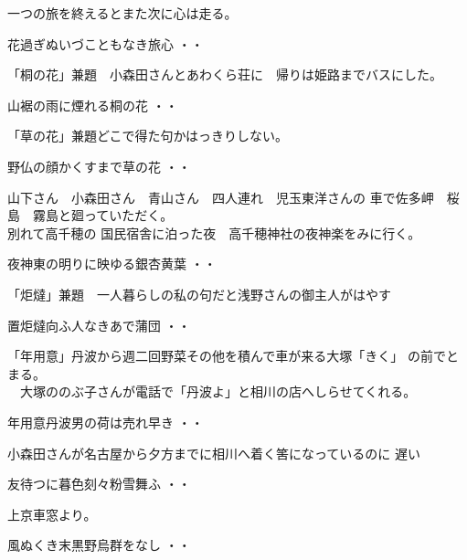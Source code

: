 \vspace{0.6cm}
一つの旅を終えるとまた次に心は走る。
\begin{shiika}花過ぎぬいづこともなき旅心
\hfill{・・}\end{shiika}
\vspace{0.6cm}
「桐の花」兼題　小森田さんとあわくら荘に　帰りは姫路までバスにした。
\begin{shiika}山裾の雨に煙れる桐の花
\hfill{・・}\end{shiika}
\vspace{0.6cm}
「草の花」兼題どこで得た句かはっきりしない。
\begin{shiika}野仏の顔かくすまで草の花
\hfill{・・}\end{shiika}
\vspace{0.6cm}
山下さん　小森田さん　青山さん　四人連れ　児玉東洋さんの
車で佐多岬　桜島　霧島と廻っていただく。\\別れて高千穂の
国民宿舎に泊った夜　高千穂神社の夜神楽をみに行く。
\begin{shiika}夜神東の明りに映ゆる銀杏黄葉
\hfill{・・}\end{shiika}
\vspace{0.6cm}
「炬燵」兼題　一人暮らしの私の句だと浅野さんの御主人がはやす
\begin{shiika}置炬燵向ふ人なきあで蒲団
\hfill{・・}\end{shiika}
\vspace{0.6cm}
「年用意」丹波から週二回野菜その他を積んで車が来る大塚「きく」
の前でとまる。\\　大塚ののぶ子さんが電話で「丹波よ」と相川の店へしらせてくれる。
\begin{shiika}年用意丹波男の荷は売れ早き
\hfill{・・}\end{shiika}
\vspace{0.6cm}
\vspace{0.6cm}
小森田さんが名古屋から夕方までに相川へ着く筈になっているのに
遅い
\begin{shiika}友待つに暮色刻々粉雪舞ふ
\hfill{・・}\end{shiika}
\vspace{0.6cm}
上京車窓より。
\begin{shiika}風ぬくき末黒野烏群をなし
\hfill{・・}\end{shiika}
